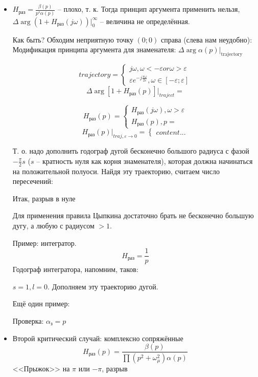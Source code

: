 \documentclass[main.tex]{subfiles}
\begin{document}
\begin{itemize}[noitemsep]
	\item $ H_{\text{раз}} = \frac{\beta(p)}{p^s \alpha(p)} $ -- плохо, т. к.
	Тогда принцип аргумента применить нельзя, $ \Delta \arg (1 + H_{\text{раз}}(j \omega)) |_0^{\infty} $ -- величина не определённая.
	
	Как быть? %
   Обходим неприятную точку $ (0;0) $ справа (слева нам неудобно): %
   Модификация принципа аргумента для знаменателя: $\Delta \arg \alpha(p) |_{\text{trajectory}}$
   
   $$ trajectory = \begin{cases}
   j \omega, \omega < - \varepsilon or \omega > \varepsilon \\
   \varepsilon e^{- j \frac{\pi \omega}{ 2 \varepsilon}}, \omega \in [- \varepsilon; \varepsilon]
   \end{cases} $$
   $$ \Delta \arg [1 + H_{\text{раз}}(p)] |_{traject} =  $$
   
   $$ H_{\text{раз}}(p) = \begin{cases}
   H_{\text{раз}}(j \omega), \omega > \varepsilon \\
   H_{\text{раз}}(p), p = %
   \end{cases} $$
   $$ H_{\text{раз}}(p) |_{traj, \varepsilon \to 0} = \begin{cases}
   content...
   \end{cases} $$
   
   Т. о. надо дополнить годограф дугой бесконечно большого радиуса с фазой $ - \frac{\pi}{2}s $ ($ s $ -- кратность нуля как корня знаменателя), которая должна начинаться на положительной полуоси.
   Найдя эту траекторию, считаем число пересечений:
   
   Итак, разрыв в нуле %
   
   Для применения правила Цыпкина достаточно брать не бесконечно большую дугу, а любую с радиусом $ > 1 $.
   
   Пример: интегратор.
   $$ H_{\text{раз}} = \frac{1}{p} $$
   Годограф интегратора, напомним, таков:
   
   $ s = 1, l = 0 $.
   Дополняем эту траекторию дугой.
   
   Ещё один пример:
   $$  $$
   
   Проверка: $ \alpha_{\text{з}} = p^{} $ %
\item Второй критический случай: комплексно сопряжённые 
$$ H_{\text{раз}}(p) = \frac{\beta(p)}{\prod(p^2 + \omega_\mu^2) \alpha(p)} $$
<<Прыжок>> на $\pi$ или $-\pi$, разрыв


\end{itemize}
\end{document}
